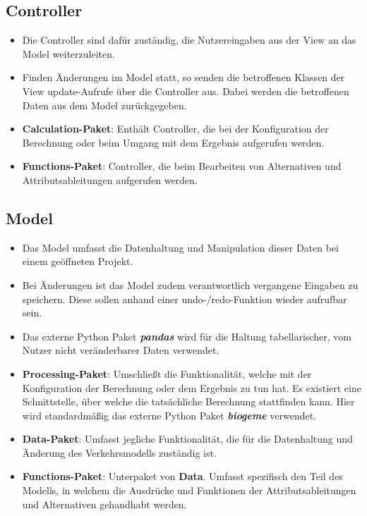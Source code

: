\documentclass{article}
\begin{document}
\subsection{Controller}
\begin{itemize}
\item Die Controller sind dafür zuständig, die Nutzereingaben aus der View an das Model weiterzuleiten.\\
\item Finden Änderungen im Model statt, so senden die betroffenen Klassen der View update-Aufrufe über die Controller aus. Dabei werden die betroffenen Daten aus dem Model zurückgegeben.\\
\item \textbf{Calculation-Paket}: Enthält Controller, die bei der Konfiguration der Berechnung oder beim Umgang mit dem Ergebnis aufgerufen werden. \\
\item \textbf{Functions-Paket}: Controller, die beim Bearbeiten von Alternativen und
Attributsableitungen aufgerufen werden.
\end{itemize}

\subsection{Model}
\begin{itemize}
\item Das Model umfasst die Datenhaltung und Manipulation dieser Daten bei einem geöffneten Projekt.\\
\item Bei Änderungen ist das Model zudem verantwortlich vergangene Eingaben zu speichern. Diese sollen anhand einer undo-/redo-Funktion wieder aufrufbar sein.\\
\item Das externe Python Paket \textit{\textbf{pandas}} wird für die Haltung tabellarischer, vom Nutzer nicht veränderbarer Daten verwendet.
\item \textbf{Processing-Paket}: Umschließt die Funktionalität, welche mit der Konfiguration der Berechnung oder dem Ergebnis zu tun hat. Es existiert eine Schnittstelle, über welche die tatsächliche Berechnung stattfinden kann. Hier wird standardmäßig das externe Python Paket \textit{\textbf{biogeme}} verwendet.\\
\item \textbf{Data-Paket}: Umfasst jegliche Funktionalität, die für die Datenhaltung und Änderung des Verkehrsmodells zuständig ist. \\
\item \textbf{Functions-Paket}: Unterpaket von \textbf{Data}. Umfasst spezifisch den Teil des Modells, in welchem die Ausdrücke und Funktionen der Attributsableitungen und Alternativen gehandhabt werden. \\
\end{itemize}
\end{document}
